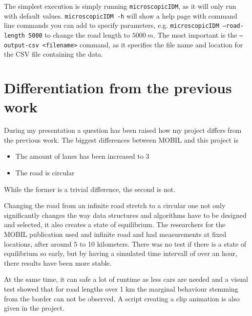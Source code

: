 The simplest execution is simply running \texttt{microscopicIDM}, as it will only run with default
values. \texttt{microscopicIDM -h} will show a help page with command line commands you can add to
specify parameters, e.g. \texttt{microscopicIDM --road-length 5000} to change the road length to
$\SI{5000}{m}$. The most important is the \texttt{--output-csv <filename>} command, as it specifies
the file name and location for the CSV file containing the data.

\section{Differentiation from the previous work}
\label{sec:diff_previous}
During my presentation a question has been raised how my project differs from the previous work. The
biggest differences between MOBIL and this project is
\begin{itemize}
  \item The amount of lanes has been increased to 3
  \item The road is circular
\end{itemize}
While the former is a trivial difference, the second is not. 

Changing the road from an infinite road stretch to a circular one  not only significantly changes the
way data structures and algorithms have to be designed and selected, it also creates a state of
equilibrium. The researchers for the MOBIL publication used and infinite road and had measurements
at fixed locations, after around 5 to 10 kilometers. There was no test if there is a state of
equilibrium so early, but by having a simulated time intervall of over an hour, there results have
been more stable. 

At the same time, it can safe a lot of runtime as less cars are needed and a visual test showed that
for road lengths over 1 km the marginal behaviour stemming from the border can not be observed. A
script creating a clip animation is also given in the project.


